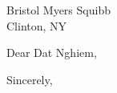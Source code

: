 \documentclass[12pt]{letter}
\begin{document}
\begin{letter}{Bristol Myers Squibb \\ Clinton, NY}

\opening{Dear Dat Nghiem,}



\thispagestyle{uciletter}

\closing{Sincerely,}

\end{letter}
\end{document}
